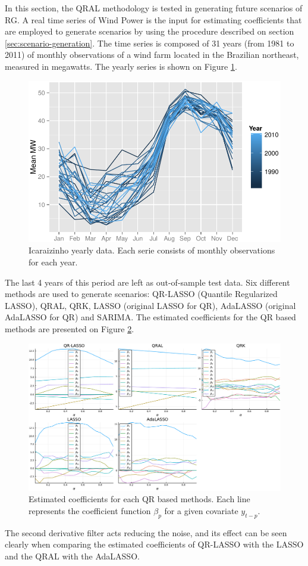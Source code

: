 In this section, the QRAL methodology is tested in generating future scenarios of RG. A real time series of Wind Power is the input for estimating coefficients that are employed to generate scenarios by using the procedure described on section \ref{sec:scenario-generation}.
The time series is composed of 31 years (from 1981 to 2011) of monthly observations  of a wind farm located in the Brazilian northeast, measured in megawatts. The yearly series is shown on Figure \ref{fig:icaraizinho-mensal}.
\begin{figure}[h]
\centering
\includegraphics[width=0.8\linewidth]{Images/icaraizinho-mensal2}
\caption{Icaraizinho yearly data. Each serie consists of monthly observations for each year.}
\label{fig:icaraizinho-mensal}
\end{figure}

The last 4 years of this period are left as out-of-sample test data. Six different methods are used to generate scenarios: QR-LASSO (Quantile Regularized LASSO), QRAL, QRK, LASSO (original LASSO for QR), AdaLASSO (original AdaLASSO for QR) and SARIMA. The estimated coefficients for the QR based methods are presented on Figure \ref{fig:betas-icaraizinho}. 
\begin{figure}[h]
	\centering
	\includegraphics[width=1.0\linewidth]{Images/betas-icaraizinho}
	\caption{Estimated coefficients for each QR based methods. Each line represents the coefficient function $\beta_{p}$ for a given covariate $y_{t-p}$.}
	\label{fig:betas-icaraizinho}
\end{figure}
The second derivative filter acts reducing the noise, and its effect can be seen clearly when comparing the estimated coefficients of QR-LASSO with the LASSO and the QRAL with the AdaLASSO. 

